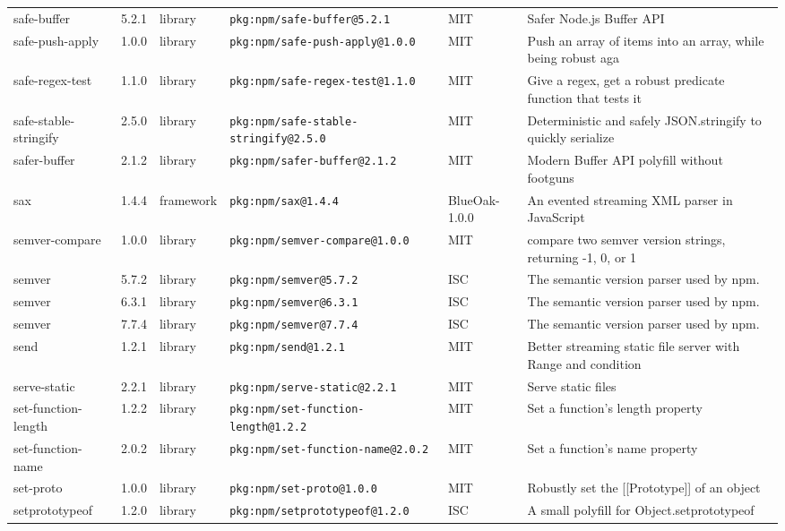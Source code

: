 \documentclass[11pt]{article}
\begin{document}
\begin{longtable}{|l|l|l|p{2.2cm}|l|p{4cm}|}
safe-buffer & 5.2.1 & library & \texttt{pkg:npm/safe-buffer@5.2.1} & MIT & Safer Node.js Buffer API \\
safe-push-apply & 1.0.0 & library & \texttt{pkg:npm/safe-push-apply@1.0.0} & MIT & Push an array of items into an array, while being robust aga \\
safe-regex-test & 1.1.0 & library & \texttt{pkg:npm/safe-regex-test@1.1.0} & MIT & Give a regex, get a robust predicate function that tests it  \\
safe-stable-stringify & 2.5.0 & library & \texttt{pkg:npm/safe-stable-stringify@2.5.0} & MIT & Deterministic and safely JSON.stringify to quickly serialize \\
safer-buffer & 2.1.2 & library & \texttt{pkg:npm/safer-buffer@2.1.2} & MIT & Modern Buffer API polyfill without footguns \\
sax & 1.4.4 & framework & \texttt{pkg:npm/sax@1.4.4} & BlueOak-1.0.0 & An evented streaming XML parser in JavaScript \\
semver-compare & 1.0.0 & library & \texttt{pkg:npm/semver-compare@1.0.0} & MIT & compare two semver version strings, returning -1, 0, or 1 \\
semver & 5.7.2 & library & \texttt{pkg:npm/semver@5.7.2} & ISC & The semantic version parser used by npm. \\
semver & 6.3.1 & library & \texttt{pkg:npm/semver@6.3.1} & ISC & The semantic version parser used by npm. \\
semver & 7.7.4 & library & \texttt{pkg:npm/semver@7.7.4} & ISC & The semantic version parser used by npm. \\
send & 1.2.1 & library & \texttt{pkg:npm/send@1.2.1} & MIT & Better streaming static file server with Range and condition \\
serve-static & 2.2.1 & library & \texttt{pkg:npm/serve-static@2.2.1} & MIT & Serve static files \\
set-function-length & 1.2.2 & library & \texttt{pkg:npm/set-function-length@1.2.2} & MIT & Set a function's length property \\
set-function-name & 2.0.2 & library & \texttt{pkg:npm/set-function-name@2.0.2} & MIT & Set a function's name property \\
set-proto & 1.0.0 & library & \texttt{pkg:npm/set-proto@1.0.0} & MIT & Robustly set the [[Prototype]] of an object \\
setprototypeof & 1.2.0 & library & \texttt{pkg:npm/setprototypeof@1.2.0} & ISC & A small polyfill for Object.setprototypeof \\

\end{longtable}
\end{document}
